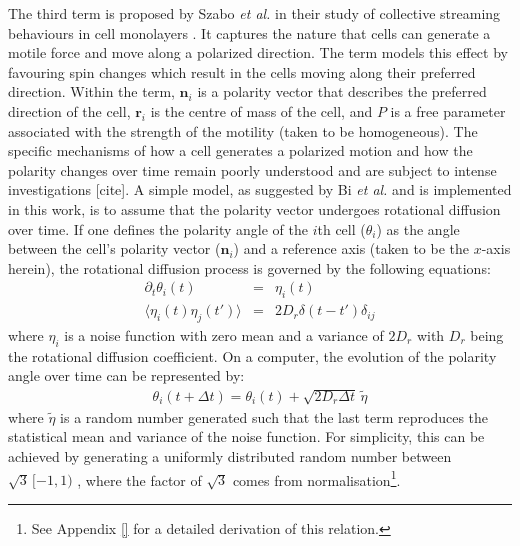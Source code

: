 \documentclass[a4paper,12pt]{article}
\begin{document}
The third term is proposed by Szabo \emph{et al.} in their study of collective streaming behaviours in cell monolayers \cite{szabo2010}. It captures the nature that cells can generate a motile force and move along a polarized direction. The term models this effect by favouring spin changes which result in the cells moving along their preferred direction. Within the term, $\bm{n}_i$ is a polarity vector that describes the preferred direction of the cell, $\bm{r}_i$ is the centre of mass of the cell, and $P$ is a free parameter associated with the strength of the motility (taken to be homogeneous). The specific mechanisms of how a cell generates a polarized motion and how the polarity changes over time remain poorly understood and are subject to intense investigations [cite]. A simple model, as suggested by Bi \emph{et al.} \cite{bi2015motility} and is implemented in this work, is to assume that the polarity vector undergoes rotational diffusion over time. If one defines the polarity angle of the $i$th cell ($\theta_i$) as the angle between the cell's polarity vector ($\bm{n}_i$) and a reference axis (taken to be the $x$-axis herein), the rotational diffusion process is governed by the following equations:
\begin{eqnarray}
\partial_t\theta_i(t) & = & \eta_i(t)\\
\langle{\eta_i(t)\eta_j(t')\rangle} & = & 2D_r\delta(t-t')\delta_{ij}
\end{eqnarray}
where $\eta_i$ is a noise function with zero mean and a variance of $2D_r$ with $D_r$ being the rotational diffusion coefficient. On a computer, the evolution of the polarity angle over time can be represented by:
\begin{eqnarray}
\label{eqn:computerRotateDiff}
\theta_i(t+\Delta t) = \theta_i(t) + \sqrt{2D_r\Delta t}\,\tilde\eta
\end{eqnarray}
where $\tilde\eta$ is a random number generated such that the last term reproduces the statistical mean and variance of the noise function. For simplicity, this can be achieved by generating a uniformly distributed random number between $\sqrt{3}\,[-1,1)$ , where the factor of $\sqrt{3}$ comes from normalisation\footnote{See Appendix \ref{} for a detailed derivation of this relation.}.
\end{document}
